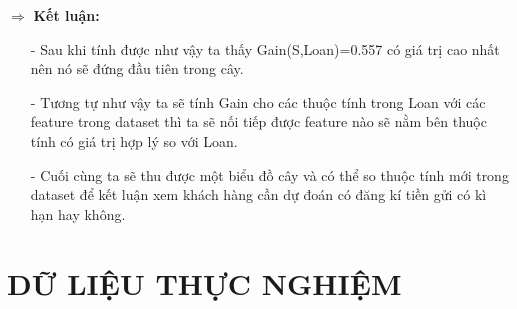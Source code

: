\documentclass{report}
\begin{document}
    $\Rightarrow$ \textbf{Kết luận: }
    \begin{enumerate}
        \item[- ] Sau khi tính được như vậy ta thấy Gain(S,Loan)=0.557 có giá trị cao nhất nên nó sẽ đứng đầu tiên trong cây.
        \item[- ] Tương tự như vậy ta sẽ tính Gain cho các thuộc tính trong Loan với các feature trong dataset thì ta sẽ nối tiếp được feature nào sẽ nằm bên thuộc tính có giá trị hợp lý so với Loan.
        \item[- ] Cuối cùng ta sẽ thu được một biểu đồ cây và có thể so thuộc tính mới trong dataset để kết luận xem khách hàng cần dự đoán có đăng kí tiền gửi có kì hạn hay không.
    \end{enumerate}
   
\fontsize{16}{10}\selectfont
\chapter{DỮ LIỆU THỰC NGHIỆM}
\fontsize{14}{10}\selectfont
\end{document}
